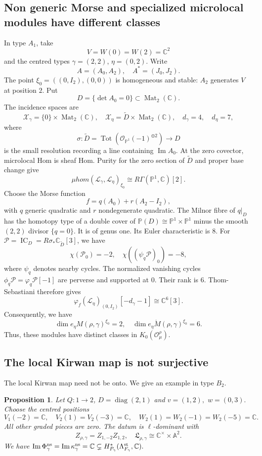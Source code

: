 \documentclass[11pt,reqno]{amsart}
\newtheorem{Proposition}[Theorem]{Proposition}
\theoremstyle{definition}
\theoremstyle{remark}
\def\bbC{\mathbb C}
\def\scrX{\mathscr X}
\def\scrO{\mathscr O}
\providecommand{\calO}{\mathcal O}
\def\IC{\operatorname{IC}}
\def\muhom{\mu hom}
\begin{document}
\subsection{Non generic Morse and specialized microlocal modules have different classes}
\label{ex:A1-K0-special}
In type $A_1$, take 
$$V=W(0)=W(2)=\bbC^2$$ and the centred types
$\gamma=(2,2)$, $\eta=(0,2)$. Write 
$$A=(A_0,A_2)
,\quad
A^*=(J_0,J_2).$$ 
The point $\xi_0=((0,I_2),(0,0))$ is homogeneous
and stable: $A_2$ generates $V$ at position $2$. Put
$$D=\{\det A_0=0\}\subset\operatorname{Mat}_2(\bbC).$$
The incidence spaces are
\[
 \scrX_\gamma=\{0\}\times\operatorname{Mat}_2(\bbC),\quad
 \scrX_\eta=\widetilde D\times\operatorname{Mat}_2(\bbC),
 \quad d_\gamma=4,\quad d_\eta=7,
\]
where 
$$\sigma:\widetilde D=\operatorname{Tot}
(\calO_{\mathbb P^1}(-1)^{\oplus2})\to D$$ is the small resolution
recording a line containing $\operatorname{Im}A_0$.
At the zero covector, microlocal Hom is  sheaf Hom.
Purity for the zero section of $\widetilde D$ and proper base change give
\[
 \muhom(\mathscr L_\gamma,\mathscr L_\eta)_{\xi_0}
 \cong R\Gamma(\mathbb P^1,\bbC)[2].
\]
Choose the Morse function
$$f=q(A_0)+r(A_2-I_2),$$
with $q$ generic quadratic and $r$
nondegenerate quadratic. The Milnor fibre of $q|_D$ has the homotopy type of a double cover
of $\mathbb P(D)\cong\mathbb P^1\times\mathbb P^1$ minus the smooth
$(2,2)$ divisor $\{q=0\}$. It is of genus one. Its Euler characteristic is $8$.
For $\mathcal P=\IC_D=R\sigma_*\bbC_{\widetilde D}[3]$, we have
$$\chi(\mathcal P_0)=-2
,\quad
\chi((\psi_q\mathcal P)_0)=-8,$$
where $\psi_q$ denotes nearby cycles.
The normalized vanishing cycles $\phi_q\mathcal P=\varphi_q\mathcal P[-1]$ are perverse
and supported at $0$. Their rank is $6$.
Thom-Sebastiani therefore gives
$$\varphi_f(\mathscr L_\eta)_{(0,I_2)}[-d_\gamma-1]\cong\bbC^6[3].$$
Consequently, we have
\[
 \dim e_\eta M(\rho,\gamma)^{\xi_0}=2,\quad
 \dim e_\eta\mathring M(\rho,\gamma)^{\xi_0}=6.
\]
Thus, these modules have distinct classes in $K_0(\scrO_\mu^\rho)$.








\subsection{The local Kirwan map is not surjective}
\label{subsec:B2-local-kirwan}
The local Kirwan map need not be onto.
We give an example in type $B_2$.

\begin{Proposition}\label{prop:B2-local-kirwan}
Let $Q:1\to 2$, $D=\operatorname{diag}(2,1)$ and $v=(1,2),$ $w=(0,3).$
Choose the centred positions
\[
 V_1(-2)=\bbC,\quad V_2(1)=V_2(-3)=\bbC,
 \quad W_2(1)=W_2(-1)=W_2(-5)=\bbC.
\]
All other graded pieces are zero. The datum is $\ell$-dominant with
\[
 Z_{\rho,\gamma}=Z_{1,-2}Z_{1,2},\quad
 \mathfrak L_{\rho,\gamma}
       \cong\bbC^\times\times\mathbb A^2.
\]
We have
$\operatorname{Im}\Phi^{\rm ns}_\gamma
  =\operatorname{Im}\kappa^{\rm ns}_\gamma=\bbC
  \subsetneq H^*_{P_\gamma}(\Lambda^{\rm st}_{F_\gamma},\bbC).$
\end{Proposition}
\end{document}
